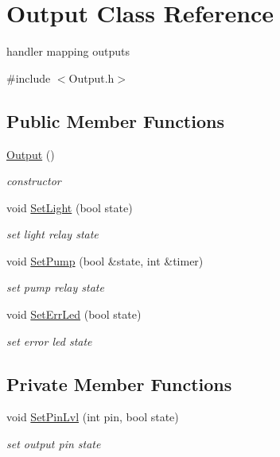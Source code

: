 \hypertarget{class_output}{}\section{Output Class Reference}
\label{class_output}


handler mapping outputs  




{\ttfamily \#include $<$Output.\+h$>$}

\subsection*{Public Member Functions}
\begin{DoxyCompactItemize}
\item 
\mbox{\label{class_output_a428c663520336477a12f1a33504eb067}} 
\hyperlink{class_output_a428c663520336477a12f1a33504eb067}{Output} ()
\begin{DoxyCompactList}\small\item\em constructor \end{DoxyCompactList}\item 
void \hyperlink{class_output_a6da518ba07072a13a7f143d12adc1246}{Set\+Light} (bool state)
\begin{DoxyCompactList}\small\item\em set light relay state \end{DoxyCompactList}\item 
void \hyperlink{class_output_a3d0ab08436b9c18861a2ae060f0aec88}{Set\+Pump} (bool \&state, int \&timer)
\begin{DoxyCompactList}\small\item\em set pump relay state \end{DoxyCompactList}\item 
void \hyperlink{class_output_a1e7758e1982620e4c162d171f6c07689}{Set\+Err\+Led} (bool state)
\begin{DoxyCompactList}\small\item\em set error led state \end{DoxyCompactList}\end{DoxyCompactItemize}
\subsection*{Private Member Functions}
\begin{DoxyCompactItemize}
\item 
void \hyperlink{class_output_a3e677a7f19fd58a5e62a093f5eb685db}{Set\+Pin\+Lvl} (int pin, bool state)
\begin{DoxyCompactList}\small\item\em set output pin state \end{DoxyCompactList}\end{DoxyCompactItemize}


